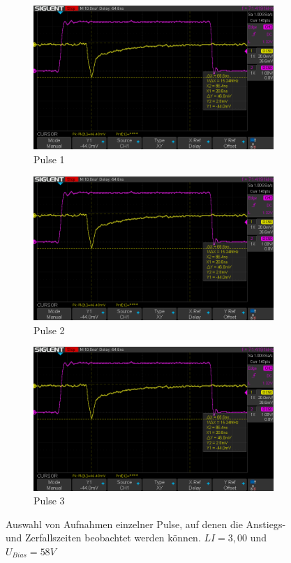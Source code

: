 \documentclass[12pt]{article}
\begin{document}
\begin{figure}[h!]
  \centering
  \begin{subfigure}[t]{0.32\textwidth}
    \includegraphics[width=\textwidth]{Grafiken/4-1-2/Zerfall1}
    \caption{Pulse 1}
  \end{subfigure}
  \hfill
  \begin{subfigure}[t]{0.32\textwidth}
    \includegraphics[width=\textwidth]{Grafiken/4-1-2/Zerfall1}
    \caption{Pulse 2}
  \end{subfigure}
  \hfill
  \begin{subfigure}[t]{0.32\textwidth}
    \includegraphics[width=\textwidth]{Grafiken/4-1-2/Zerfall1}
    \caption{Pulse 3}
  \end{subfigure}
  \caption{Auswahl von Aufnahmen einzelner Pulse, auf denen die Anstiegs- und Zerfallszeiten beobachtet werden können. $LI=3,00$ und $U_{Bias}=58V$}
  \label{EinzelpulseOszi}
\end{figure}
\end{document}
